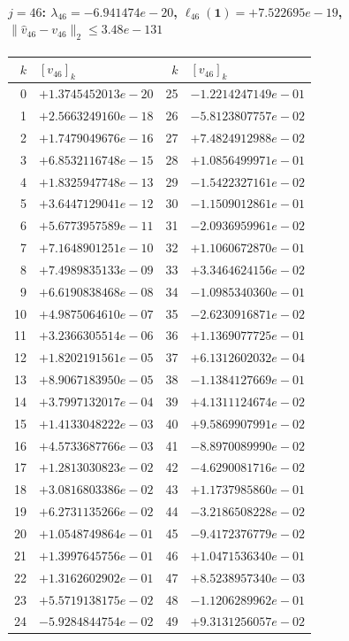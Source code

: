 \documentclass[11pt]{article}
\begin{document}
\paragraph{$j = 46$: $\lambda_{46} = -6.941474e-20$, \quad $\ell_{46}(\mathbf{1}) = +7.522695e-19$, \quad $\|\hat{v}_{46} - v_{46}\|_2 \leq 3.48e-131$}
\begin{center}
{\footnotesize
\begin{tabular}{r@{\;\;}l@{\quad}r@{\;\;}l}
\toprule
$k$ & $[v_{46}]_k$ & $k$ & $[v_{46}]_k$ \\
\midrule
0 & $+1.3745452013e-20$ & 25 & $-1.2214247149e-01$ \\
1 & $+2.5663249160e-18$ & 26 & $-5.8123807757e-02$ \\
2 & $+1.7479049676e-16$ & 27 & $+7.4824912988e-02$ \\
3 & $+6.8532116748e-15$ & 28 & $+1.0856499971e-01$ \\
4 & $+1.8325947748e-13$ & 29 & $-1.5422327161e-02$ \\
5 & $+3.6447129041e-12$ & 30 & $-1.1509012861e-01$ \\
6 & $+5.6773957589e-11$ & 31 & $-2.0936959961e-02$ \\
7 & $+7.1648901251e-10$ & 32 & $+1.1060672870e-01$ \\
8 & $+7.4989835133e-09$ & 33 & $+3.3464624156e-02$ \\
9 & $+6.6190838468e-08$ & 34 & $-1.0985340360e-01$ \\
10 & $+4.9875064610e-07$ & 35 & $-2.6230916871e-02$ \\
11 & $+3.2366305514e-06$ & 36 & $+1.1369077725e-01$ \\
12 & $+1.8202191561e-05$ & 37 & $+6.1312602032e-04$ \\
13 & $+8.9067183950e-05$ & 38 & $-1.1384127669e-01$ \\
14 & $+3.7997132017e-04$ & 39 & $+4.1311124674e-02$ \\
15 & $+1.4133048222e-03$ & 40 & $+9.5869907991e-02$ \\
16 & $+4.5733687766e-03$ & 41 & $-8.8970089990e-02$ \\
17 & $+1.2813030823e-02$ & 42 & $-4.6290081716e-02$ \\
18 & $+3.0816803386e-02$ & 43 & $+1.1737985860e-01$ \\
19 & $+6.2731135266e-02$ & 44 & $-3.2186508228e-02$ \\
20 & $+1.0548749864e-01$ & 45 & $-9.4172376779e-02$ \\
21 & $+1.3997645756e-01$ & 46 & $+1.0471536340e-01$ \\
22 & $+1.3162602902e-01$ & 47 & $+8.5238957340e-03$ \\
23 & $+5.5719138175e-02$ & 48 & $-1.1206289962e-01$ \\
24 & $-5.9284844754e-02$ & 49 & $+9.3131256057e-02$ \\
\bottomrule
\end{tabular}
}
\end{center}
\end{document}
